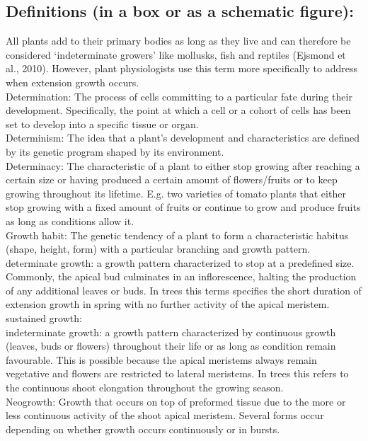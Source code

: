 \documentclass{article}
\begin{document}
	\subsection*{Definitions (in a box or as a schematic figure):}
	All plants add to their primary bodies as long as they live and can therefore be considered ‘indeterminate growers’ like mollusks, fish and reptiles (Ejsmond et al., 2010). However, plant physiologists use this term more specifically to address when extension growth occurs.\\
	Determination: The process of cells committing to a particular fate during their development. Specifically, the point at which a cell or a cohort of cells has been set to develop into a specific tissue or organ.\\
	Determinism: The idea that a plant’s development and characteristics are defined by its genetic program shaped by its environment. \\
	Determinacy: The characteristic of a plant to either stop growing after reaching a certain size or having produced a certain amount of flowers/fruits or to keep growing throughout its lifetime. E.g. two varieties of tomato plants that either stop growing with a fixed amount of fruits or continue to grow and produce fruits as long as conditions allow it. \\
	Growth habit: The genetic tendency of a plant to form a characteristic habitus (shape, height, form) with a particular branching and growth pattern. 
	determinate growth: a growth pattern characterized to stop at a predefined size. Commonly, the apical bud culminates in an inflorescence, halting the production of any additional leaves or buds. In trees this terms specifies the short duration of extension growth in spring with no further activity of the apical meristem.\\
	sustained growth:\\
	indeterminate growth: a growth pattern characterized by continuous growth (leaves, buds or flowers) throughout their life or as long as condition remain favourable. This is possible because the apical meristems always remain vegetative and flowers are restricted to lateral meristems. In trees this refers to the continuous shoot elongation throughout the growing season.\\
	Neogrowth: Growth that occurs on top of preformed tissue due to the more or less continuous activity of the shoot apical meristem. Several forms occur depending on whether growth occurs continuously or in bursts.\\
\end{document}
